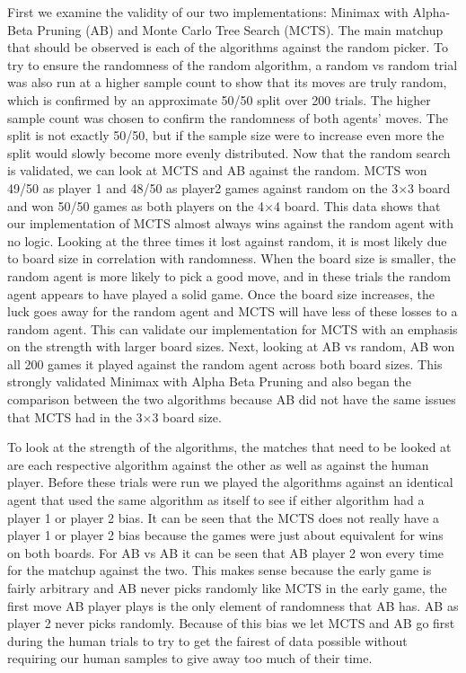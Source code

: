 \documentclass[12pt]{article}
\begin{document}
    First we examine the validity of our two implementations: Minimax with Alpha-Beta Pruning (AB) and Monte Carlo Tree Search (MCTS). The main matchup that should be observed is each of the algorithms against the random picker. To try to ensure the randomness of the random algorithm, a random vs random trial was also run at a higher sample count to show that its moves are truly random, which is confirmed by an approximate 50/50 split over 200 trials. The higher sample count was chosen to confirm the randomness of both agents’ moves. The split is not exactly 50/50, but if the sample size were to increase even more the split would slowly become more evenly distributed. Now that the random search is validated, we can look at MCTS and AB against the random. MCTS won 49/50 as player 1 and 48/50 as player2  games against random on the 3\(\times\)3 board and won 50/50 games as both players on the 4\(\times\)4 board. This data shows that our implementation of MCTS almost always wins against the random agent with no logic. Looking at the three times it lost against random, it is most likely due to board size in correlation with randomness. When the board size is smaller, the random agent is more likely to pick a good move, and in these trials the random agent appears to have played a solid game. Once the board size increases, the luck goes away for the random agent and MCTS will have less of these losses to a random agent. This can validate our implementation for MCTS with an emphasis on the strength with larger board sizes. Next, looking at AB vs random, AB won all 200 games it played against the random agent across both board sizes. This strongly validated Minimax with Alpha Beta Pruning and also began the comparison between the two algorithms because AB did not have the same issues that MCTS had in the 3\(\times\)3 board size.
    
    To look at the strength of the algorithms, the matches that need to be looked at are each respective algorithm against the other as well as against the human player. Before these trials were run we played the algorithms against an identical agent that used the same algorithm as itself to see if either algorithm had a player 1 or player 2 bias. It can be seen that the MCTS does not really have a player 1 or player 2 bias because the games were just about equivalent for wins on both boards. For AB vs AB it can be seen that AB player 2 won every time for the matchup against the two. This makes sense because the early game is fairly arbitrary and AB never picks randomly like MCTS in the early game, the first move AB player plays is the only element of randomness that AB has. AB as player 2 never picks randomly. Because of this bias we let MCTS and AB go first during the human trials to try to get the fairest of data possible without requiring our human samples to give away too much of their time. 
    
\end{document}
